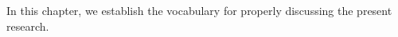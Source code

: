 

In this chapter, 
we establish the vocabulary for properly discussing the present research.







